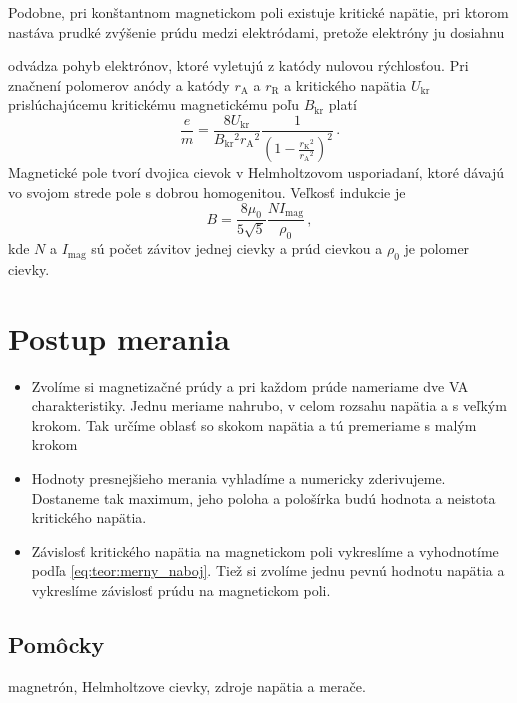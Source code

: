 \documentclass[a4paper, 10pt]{article}
\newcommand{\di}[1]{\ensuremath{_\mathrm{#1}}}
\begin{document}
Podobne, pri konštantnom magnetickom poli existuje kritické napätie, pri ktorom nastáva prudké zvýšenie prúdu medzi elektródami, pretože elektróny ju dosiahnu

\cite{stud} odvádza pohyb elektrónov, ktoré vyletujú z katódy nulovou rýchlosťou. Pri značnení polomerov anódy a katódy $r\di A$ a $r\di R$ a kritického napätia $U\di {kr}$ prislúchajúcemu kritickému magnetickému poľu $B\di{kr}$ platí 
\begin{equation}
\label{eq:teor:merny_naboj}
\frac{e}{m} = \frac{8U\di{kr}}{B\di{kr}^2r\di A ^2}\frac{1}{\left(1 - \frac{r\di K^2}{r\di A ^2}\right)^2}\,.
\end{equation}
Magnetické pole tvorí dvojica cievok v Helmholtzovom usporiadaní, ktoré dávajú vo svojom strede pole s dobrou homogenitou. Veľkosť indukcie je 
\begin{equation}
\label{eq:teor:pole}
B = \frac{8\mu_0}{5\sqrt{5}}\frac{NI\di{mag}}{\rho_0}\,,
\end{equation}
kde $N$ a $I\di{mag}$ sú počet závitov jednej cievky a prúd cievkou a $\rho_0$ je polomer cievky. 

\section*{Postup merania}
\begin{itemize}
\item Zvolíme si magnetizačné prúdy a pri každom prúde nameriame dve VA charakteristiky. Jednu meriame nahrubo, v celom rozsahu napätia a s veľkým krokom. Tak určíme oblasť so skokom napätia a tú premeriame s malým krokom 
\item Hodnoty presnejšieho merania vyhladíme a numericky zderivujeme. Dostaneme tak maximum, jeho poloha a pološírka budú hodnota a neistota kritického napätia.
\item Závislosť kritického napätia na magnetickom poli vykreslíme a vyhodnotíme podľa \ref{eq:teor:merny_naboj}. Tiež si zvolíme jednu pevnú hodnotu napätia a vykreslíme závislosť prúdu na magnetickom poli.
\end{itemize}
\subsection*{Pomôcky}
magnetrón, Helmholtzove cievky, zdroje napätia a merače. 
\end{document}
